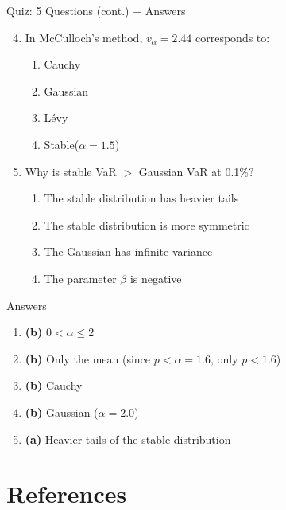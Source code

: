 \documentclass[9pt, aspectratio=169, t]{beamer}
\theoremstyle{definition}
\begin{document}
\begin{frame}{Quiz: 5 Questions (cont.) + Answers}
\begin{enumerate}
    \setcounter{enumi}{3}
    \item In McCulloch's method, $v_\alpha = 2.44$ corresponds to:
    \begin{enumerate}
        \item[(a)] Cauchy
        \item[(b)] Gaussian
        \item[(c)] L\'{e}vy
        \item[(d)] Stable($\alpha = 1.5$)
    \end{enumerate}

    \vspace{0.2cm}
    \item Why is stable VaR $>$ Gaussian VaR at 0.1\%?
    \begin{enumerate}
        \item[(a)] The stable distribution has heavier tails
        \item[(b)] The stable distribution is more symmetric
        \item[(c)] The Gaussian has infinite variance
        \item[(d)] The parameter $\beta$ is negative
    \end{enumerate}
\end{enumerate}

\vspace{0.3cm}
\begin{exampleblock}{Answers}
\begin{enumerate}
    \item \textbf{(b)} $0 < \alpha \leq 2$
    \item \textbf{(b)} Only the mean (since $p < \alpha = 1.6$, only $p < 1.6$)
    \item \textbf{(b)} Cauchy
    \item \textbf{(b)} Gaussian ($\alpha = 2.0$)
    \item \textbf{(a)} Heavier tails of the stable distribution
\end{enumerate}
\end{exampleblock}
\end{frame}

\section{References}
\end{document}
